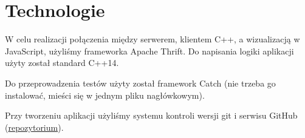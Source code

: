 \chapter{Technologie}
W celu realizacji połączenia między serwerem, klientem C++, a wizualizacją w JavaScript, użyliśmy frameworka Apache Thrift. Do napisania logiki aplikacji użyty został standard C++14.

Do przeprowadzenia testów użyty został framework Catch (nie trzeba go instalować, mieści się w jednym pliku nagłówkowym).

Przy tworzeniu aplikacji użyliśmy systemu kontroli wersji git i serwisu GitHub (\href{https://github.com/kgabryje/Core-Wars-ZPR}{repozytorium}).
